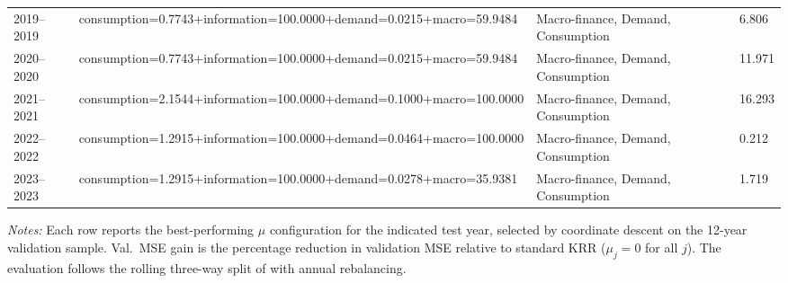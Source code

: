 \begin{table}[H]
\begin{tabular}{llll}
2019--2019  & consumption=0.7743+information=100.0000+demand=0.0215+macro=59.9484 & Macro-finance, Demand, Consumption & 6.806 \\
2020--2020  & consumption=0.7743+information=100.0000+demand=0.0215+macro=59.9484 & Macro-finance, Demand, Consumption & 11.971 \\
2021--2021  & consumption=2.1544+information=100.0000+demand=0.1000+macro=100.0000 & Macro-finance, Demand, Consumption & 16.293 \\
2022--2022  & consumption=1.2915+information=100.0000+demand=0.0464+macro=100.0000 & Macro-finance, Demand, Consumption & 0.212 \\
2023--2023  & consumption=1.2915+information=100.0000+demand=0.0278+macro=35.9381 & Macro-finance, Demand, Consumption & 1.719 \\
\bottomrule
\end{tabular}
\begin{minipage}{\textwidth}
\vspace{4pt}
\footnotesize
\textit{Notes:} Each row reports the best-performing $\mu$ configuration for the indicated test year, selected by coordinate descent on the 12-year validation sample. Val.\ MSE gain is the percentage reduction in validation MSE relative to standard KRR ($\mu_j = 0$ for all $j$). The evaluation follows the rolling three-way split of \citet{gu2020empirical} with annual rebalancing.
\end{minipage}
\end{table}